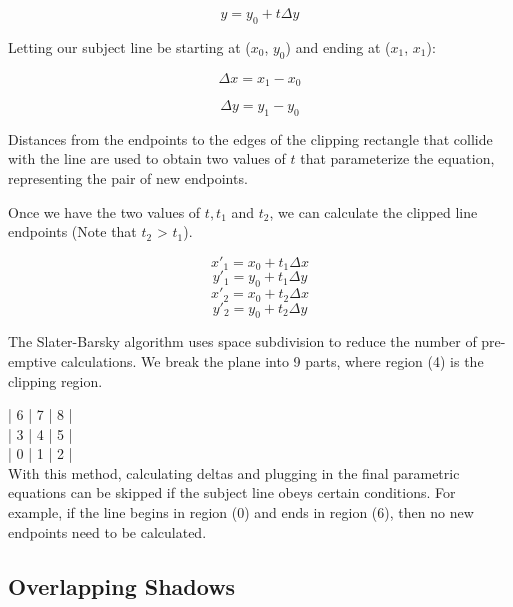 \begin{equation}
y = y_0 + t \Delta y
\end{equation}

Letting our subject line be starting at ($x_0$, $y_0$) and ending at ($x_1$, $x_1$):

\begin{equation}
\Delta x = x_1 - x_0
\end{equation}

\begin{equation}
\Delta y = y_1 - y_0
\end{equation}

Distances from the endpoints to the edges of the clipping rectangle that collide with the line are used to obtain two values of $t$ that parameterize the equation, representing the pair of new endpoints.

Once we have the two values of $t, t_1$ and $t_2$, we can calculate the clipped line endpoints (Note that $t_2$ > $t_1$).

\begin{equation}
x'_1 = x_0 + t_1 \Delta x
\end{equation}
\begin{equation}
y'_1 = y_0 + t_1 \Delta y
\end{equation}
\begin{equation}
x'_2 = x_0 + t_2 \Delta x
\end{equation}
\begin{equation}
y'_2 = y_0 + t_2 \Delta y
\end{equation}

The Slater-Barsky algorithm uses space subdivision to reduce the number of pre-emptive calculations. We break the plane into 9 parts, where region (4) is the clipping region.


| 6 | 7 | 8 | \\
| 3 | 4 | 5 | \\
| 0 | 1 | 2 | \\


With this method, calculating deltas and plugging in the final parametric equations can be skipped if the subject line obeys certain conditions. For example, if the line begins in region (0) and ends in region (6), then no new endpoints need to be calculated.

\subsection{Overlapping Shadows}\label{overlapping-shadows}

